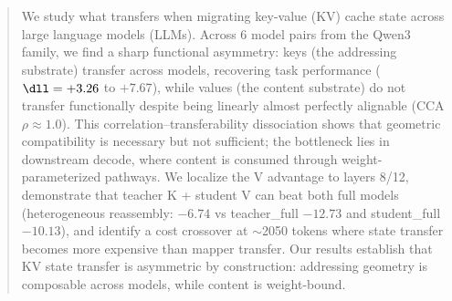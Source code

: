 
\begin{abstract}
We study what transfers when migrating key-value (KV) cache state across large language models (LLMs).
Across 6 model pairs from the Qwen3 family, we find a sharp functional asymmetry:
keys (the addressing substrate) transfer across models, recovering task performance
($\dll = +3.26$ to $+7.67$), while values (the content substrate) do not transfer
functionally despite being linearly almost perfectly alignable (CCA $\rho \approx 1.0$).
This correlation--transferability dissociation shows that geometric compatibility
is necessary but not sufficient; the bottleneck lies in downstream decode,
where content is consumed through weight-parameterized pathways.
We localize the V advantage to layers 8/12, demonstrate that teacher K + student V
can beat both full models (heterogeneous reassembly: $-6.74$ vs teacher\_full $-12.73$
and student\_full $-10.13$), and identify a cost crossover at $\sim$2050 tokens
where state transfer becomes more expensive than mapper transfer.
Our results establish that KV state transfer is asymmetric by construction:
addressing geometry is composable across models,
while content is weight-bound.
\end{abstract}
